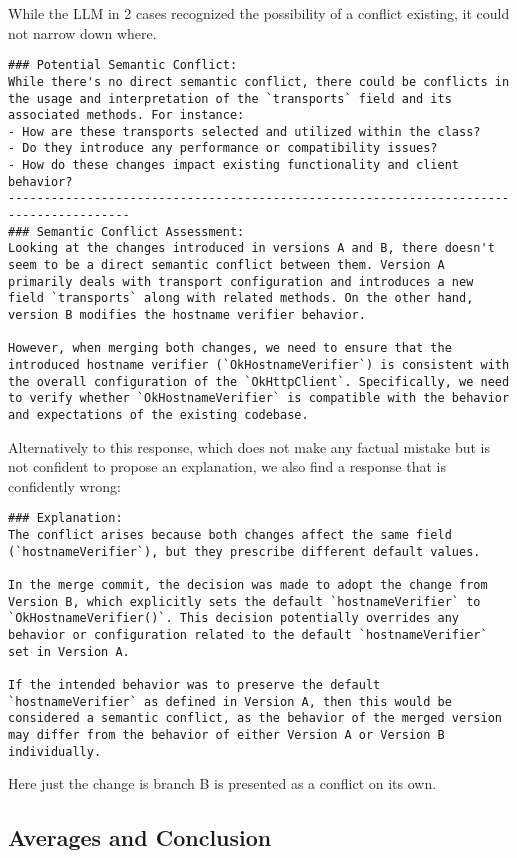 While the LLM in 2 cases recognized the possibility of a conflict existing, it could not narrow down where.
\begin{lstlisting}
### Potential Semantic Conflict:
While there's no direct semantic conflict, there could be conflicts in the usage and interpretation of the `transports` field and its associated methods. For instance:
- How are these transports selected and utilized within the class?
- Do they introduce any performance or compatibility issues?
- How do these changes impact existing functionality and client behavior?
---------------------------------------------------------------------------------------
### Semantic Conflict Assessment:
Looking at the changes introduced in versions A and B, there doesn't seem to be a direct semantic conflict between them. Version A primarily deals with transport configuration and introduces a new field `transports` along with related methods. On the other hand, version B modifies the hostname verifier behavior.

However, when merging both changes, we need to ensure that the introduced hostname verifier (`OkHostnameVerifier`) is consistent with the overall configuration of the `OkHttpClient`. Specifically, we need to verify whether `OkHostnameVerifier` is compatible with the behavior and expectations of the existing codebase.
\end{lstlisting}
Alternatively to this response, which does not make any factual mistake but is not confident to propose an explanation, we also find a response that is confidently wrong:
\begin{lstlisting}
### Explanation:
The conflict arises because both changes affect the same field (`hostnameVerifier`), but they prescribe different default values.
   
In the merge commit, the decision was made to adopt the change from Version B, which explicitly sets the default `hostnameVerifier` to `OkHostnameVerifier()`. This decision potentially overrides any behavior or configuration related to the default `hostnameVerifier` set in Version A.
    
If the intended behavior was to preserve the default `hostnameVerifier` as defined in Version A, then this would be considered a semantic conflict, as the behavior of the merged version may differ from the behavior of either Version A or Version B individually.
\end{lstlisting}
Here just the change is branch B is presented as a conflict on its own.
\subsection{Averages and Conclusion}

